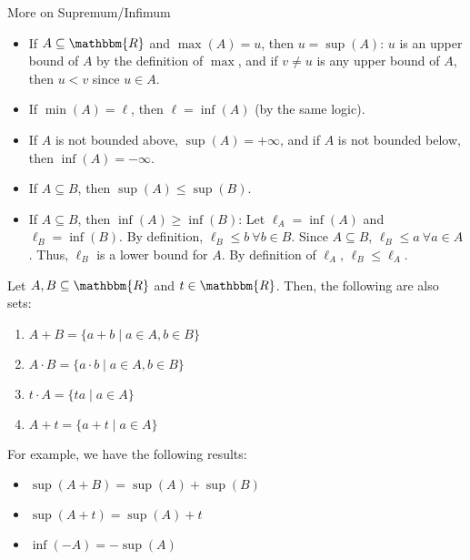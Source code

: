 \documentclass[10pt]{extarticle}
\newcommand{\R}{\mathbbm{R}}
\begin{document}
  \begin{problem}{More on Supremum/Infimum}
    \begin{itemize}
      \item If $A \subseteq \R$ and $\max(A) = u$, then $u = \sup(A)$: $u$ is an upper bound of $A$ by the definition of $\max$, and if $v\neq u$ is any upper bound of $A$, then $u < v$ since $u\in A$.
      \item If $\min(A) = \ell$, then $\ell = \inf(A)$ (by the same logic).
      \item If $A$ is not bounded above, $\sup(A) = +\infty$, and if $A$ is not bounded below, then $\inf(A) = -\infty$.
      \item If $A\subseteq B$, then $\sup(A) \leq \sup(B)$.
      \item If $A\subseteq B$, then $\inf(A) \geq \inf(B)$: Let $\ell_A = \inf(A)$ and $\ell_B = \inf(B)$. By definition, $\ell_B \leq b~\forall b\in B$. Since $A\subseteq B$, $\ell_B \leq a~\forall a\in A$. Thus, $\ell_B$ is a lower bound for $A$. By definition of $\ell_A$, $\ell_B \leq \ell_A$.
    \end{itemize}
    Let $A,B\subseteq \R$ and $t\in\R$. Then, the following are also sets:
    \begin{enumerate}[(1)]
      \item $A + B = \{a+b\mid a\in A,b\in B\}$
      \item $A\cdot B = \{a\cdot b\mid a\in A,b\in B\}$
      \item $t\cdot A = \{ta\mid a\in A\}$
      \item $A + t = \{a+t\mid a\in A\}$
    \end{enumerate}
    For example, we have the following results:
    \begin{itemize}
      \item $\sup(A+B) = \sup(A) + \sup(B)$
      \item $\sup(A+t) = \sup(A) + t$
      \item $\inf(-A) = -\sup(A)$
    \end{itemize}
  \end{problem}
\end{document}
